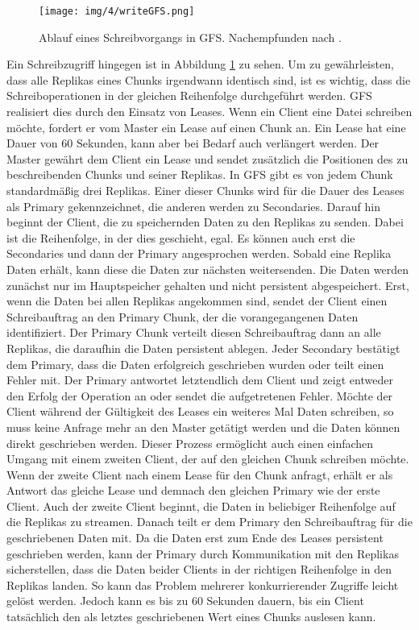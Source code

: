 \documentclass[12pt,oneside,a4paper,parskip]{scrbook}
\begin{document}
\begin{figure}[htb]
  \centering
  \texttt{[image: img/4/writeGFS.png]}
  \caption[Schreiben eines Chunks in GFS]{Ablauf eines Schreibvorgangs in GFS. Nachempfunden nach \cite{GFS}.}
  \label{writeGFS}
\end{figure}

Ein Schreibzugriff hingegen ist in Abbildung \ref{writeGFS} zu sehen. Um zu gewährleisten, dass alle Replikas eines Chunks irgendwann identisch sind, ist es wichtig, dass die Schreiboperationen in der gleichen Reihenfolge durchgeführt werden. GFS realisiert dies durch den Einsatz von Leases. Wenn ein Client eine Datei schreiben möchte, fordert er vom Master ein Lease auf einen Chunk an. Ein Lease hat eine Dauer von 60 Sekunden, kann aber bei Bedarf auch verlängert werden. Der Master gewährt dem Client ein Lease und sendet zusätzlich die Positionen des zu beschreibenden Chunks und seiner Replikas. In GFS gibt es von jedem Chunk standardmäßig drei Replikas. Einer dieser Chunks wird für die Dauer des Leases als Primary gekennzeichnet, die anderen werden zu Secondaries. Darauf hin beginnt der Client, die zu speichernden Daten zu den Replikas zu senden. Dabei ist die Reihenfolge, in der dies geschieht, egal. Es können auch erst die Secondaries und dann der Primary angesprochen werden. Sobald eine Replika Daten erhält, kann diese die Daten zur nächsten weitersenden. Die Daten werden zunächst nur im Hauptspeicher gehalten und nicht persistent abgespeichert. Erst, wenn die Daten bei allen Replikas angekommen sind, sendet der Client einen Schreibauftrag an den Primary Chunk, der die vorangegangenen Daten identifiziert. Der Primary Chunk verteilt diesen Schreibauftrag dann an alle Replikas, die daraufhin die Daten persistent ablegen. Jeder Secondary bestätigt dem Primary, dass die Daten erfolgreich geschrieben wurden oder teilt einen Fehler mit. Der Primary antwortet letztendlich dem Client und zeigt entweder den Erfolg der Operation an oder sendet die aufgetretenen Fehler. Möchte der Client während der Gültigkeit des Leases ein weiteres Mal Daten schreiben, so muss keine Anfrage mehr an den Master getätigt werden und die Daten können direkt geschrieben werden. Dieser Prozess ermöglicht auch einen einfachen Umgang mit einem zweiten Client, der auf den gleichen Chunk schreiben möchte. Wenn der zweite Client nach einem Lease für den Chunk anfragt, erhält er als Antwort das gleiche Lease und demnach den gleichen Primary wie der erste Client. Auch der zweite Client beginnt, die Daten in beliebiger Reihenfolge auf die Replikas zu streamen. Danach teilt er dem Primary den Schreibauftrag für die geschriebenen Daten mit. Da die Daten erst zum Ende des Leases persistent geschrieben werden, kann der Primary durch Kommunikation mit den Replikas sicherstellen, dass die Daten beider Clients in der richtigen Reihenfolge in den Replikas landen. So kann das Problem mehrerer konkurrierender Zugriffe leicht gelöst werden. Jedoch kann es bis zu 60 Sekunden dauern, bis ein Client tatsächlich den als letztes geschriebenen Wert eines Chunks auslesen kann.
\end{document}

